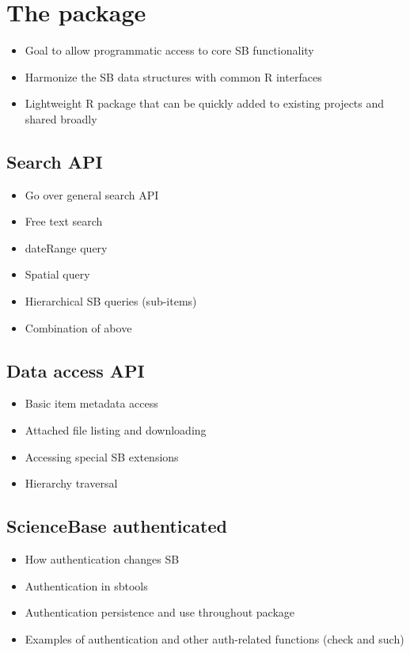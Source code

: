\section{The  package}
\begin{itemize}
	\item{Goal to allow programmatic access to core SB functionality}
	\item{Harmonize the SB data structures with common R interfaces}
	\item{Lightweight R package that can be quickly added to existing projects and shared broadly}
\end{itemize}

\subsection{Search API}
\begin{itemize}
	\item{Go over general search API}
	\item{Free text search}
	\item{dateRange query}
	\item{Spatial query}
	\item{Hierarchical SB queries (sub-items)}
	\item{Combination of above}
\end{itemize}

\subsection{Data access API}
\begin{itemize}
	\item{Basic item metadata access}
	\item{Attached file listing and downloading}
	\item{Accessing special SB extensions}
	\item{Hierarchy traversal}
\end{itemize}

\subsection{ScienceBase authenticated}
\begin{itemize}
	\item{How authentication changes SB}
	\item{Authentication in sbtools}
	\item{Authentication persistence and use throughout package}
	\item{Examples of authentication and other auth-related functions (check and such)}
\end{itemize}



